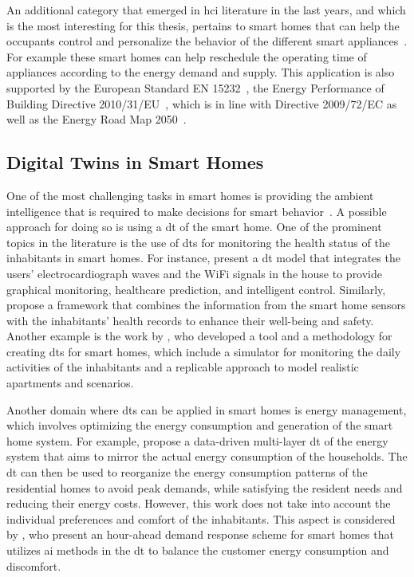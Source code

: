 An additional category that emerged in \acrfull{hci} literature in the last years, and which is the most interesting for this thesis, pertains to smart homes that can help the occupants control and personalize the behavior of the different smart appliances~\parencite{desilvaStateArtSmart2012,lobaccaroReviewSystemsTechnologies2016}. For example these smart homes can help reschedule the operating time of appliances according to the energy demand and supply. This application is also supported by the European Standard EN 15232~\parencite{comiteeuropeendenormalisationEnergyPerformanceBuildings2012}, the Energy Performance of Building Directive 2010/31/EU~\parencite{europeanparliamentDirectiveEU20182018}, which is in line with Directive 2009/72/EC as well as the Energy Road Map 2050~\parencite{europeanclimatefoundationEnergyRoadmap20502011}.

\subsection{Digital Twins in Smart Homes}

One of the most challenging tasks in smart homes is providing the ambient intelligence that
is required to make decisions for smart behavior~\parencite{desilvaStateArtSmart2012}. A possible approach for doing so is using a \acrshort{dt} of the smart home. One of the prominent topics in the literature is the use of \acrshort{dt}s for monitoring the health status of the inhabitants in smart homes. For instance, \textcite{chenDigitalTwinEmpowered2023} present a \acrshort{dt} model that integrates the users' electrocardiograph waves and the WiFi signals in the house to provide graphical monitoring, healthcare prediction, and intelligent control. Similarly, \textcite{shoukatSmartHomeEnhanced2023} propose a framework that combines the information from the smart home sensors with the inhabitants' health records to enhance their well-being and safety. Another example is the work by \textcite{bouchabouSmartHomeDigital2023}, who developed a tool and a methodology for creating \acrshort{dt}s for smart homes, which include a simulator for monitoring the daily activities of the inhabitants and a replicable approach to model realistic apartments and scenarios.

Another domain where \acrshort{dt}s can be applied in smart homes is energy management, which involves optimizing the energy consumption and generation of the smart home system. For example, \textcite{fathyDigitalTwinDrivenDecision2021} propose a data-driven multi-layer \acrshort{dt} of the energy system that aims to mirror the actual energy consumption of the households. The \acrshort{dt} can then be used to reorganize the energy consumption patterns of the residential homes to avoid peak demands, while satisfying the resident needs and reducing their energy costs. However, this work does not take into account the individual preferences and comfort of the inhabitants. This aspect is considered by \textcite{huangMachineLearningbasedDemand2023}, who present an hour-ahead demand response scheme for smart homes that utilizes \acrshort{ai} methods in the \acrshort{dt} to balance the customer energy consumption and discomfort.

